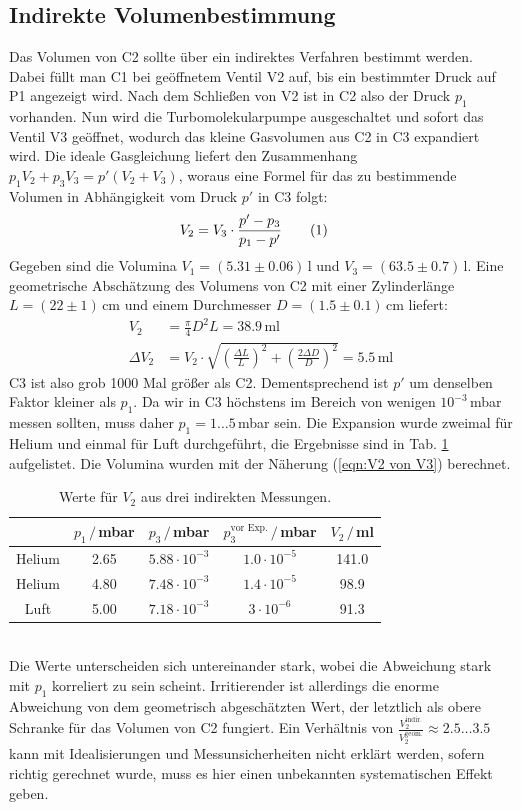 \documentclass[german, parskip=full]{scrartcl}
\newcommand\numberthis{\addtocounter{equation}{1}\tag{\theequation}}
\newcommand{\kla}{}
\newcommand{\tecxt}{}
\begin{document}
\subsection{Indirekte Volumenbestimmung}
Das Volumen von C2 sollte über ein indirektes Verfahren bestimmt werden. Dabei füllt man C1 bei geöffnetem Ventil V2 auf, bis ein bestimmter Druck auf P1 angezeigt wird. Nach dem Schließen von V2 ist in C2 also der Druck $p_1$ vorhanden. Nun wird die Turbomolekularpumpe ausgeschaltet und sofort das Ventil V3 geöffnet, wodurch das kleine Gasvolumen aus C2 in C3 expandiert wird. Die ideale Gasgleichung liefert den Zusammenhang $p_1V_2+p_3V_3=p'(V_2+V_3)$, woraus eine Formel für das zu bestimmende Volumen in Abhängigkeit vom Druck $p'$ in C3 folgt:
\begin{align*}
V_2&=V_3\cdot\frac{p'-p_3}{p_1-p'}\numberthis\label{eqn:V2 von V3}
\end{align*} 
Gegeben sind die Volumina $V_1=(5.31\pm 0.06)\,$l und $V_3=(63.5\pm 0.7)\,$l. Eine geometrische Abschätzung des Volumens von C2 mit einer Zylinderlänge $L=(22\pm 1)\,$cm und einem Durchmesser $D=(1.5\pm 0.1)\,$cm liefert:
\begin{align*}
V_2&=\frac{\pi}{4}D^2L=38.9\,\tecxt\text{ml}\\
\Delta V_2&=V_2\cdot\sqrt{\kla\left( {\frac{\Delta L}{L}} \right)^2+\kla\left( {\frac{2\Delta D}{D}} \right)^2}=5.5\,\tecxt\text{ml}
\end{align*}
C3 ist also grob 1000 Mal größer als C2. Dementsprechend ist $p'$ um denselben Faktor kleiner als $p_1$. Da wir in C3 höchstens im Bereich von wenigen $10^{-3}\,$mbar messen sollten, muss daher $p_1=1\dots 5\,$mbar sein. Die Expansion wurde zweimal für Helium und einmal für Luft durchgeführt, die Ergebnisse sind in Tab. \ref{table:Volumenbestimmung} aufgelistet. Die Volumina wurden mit der Näherung (\ref{eqn:V2 von V3}) berechnet.
\begin{table}[h!]
\centering
\begin{tabular}{c|c|c|c|c}
&$p_1\,/\,$mbar&$p_3\,/\,$mbar&$p_3^\tecxt\text{vor Exp.}\,/\,$mbar&$V_2\,/\,$ml\\ \hline
Helium&2.65&$5.88\cdot 10^{-3}$&$1.0\cdot 10^{-5}$&141.0\\ \hline
Helium&4.80&$7.48\cdot 10^{-3}$&$1.4\cdot 10^{-5}$&98.9\\ \hline
Luft&5.00&$7.18\cdot 10^{-3}$&$3\cdot 10^{-6}$&91.3\\
\end{tabular}
\caption{Werte für $V_2$ aus drei indirekten Messungen.}
\label{table:Volumenbestimmung}
\end{table}\\
Die Werte unterscheiden sich untereinander stark, wobei die Abweichung stark mit $p_1$ korreliert zu sein scheint. Irritierender ist allerdings die enorme Abweichung von dem geometrisch abgeschätzten Wert, der letztlich als obere Schranke für das Volumen von C2 fungiert. Ein Verhältnis von $\frac{V_2^\tecxt\text{indir.}}{V_2^\tecxt\text{geom.}}\approx 2.5\dots 3.5$ kann mit Idealisierungen und Messunsicherheiten nicht erklärt werden, sofern richtig gerechnet wurde, muss es hier einen unbekannten systematischen Effekt geben.
\end{document}
